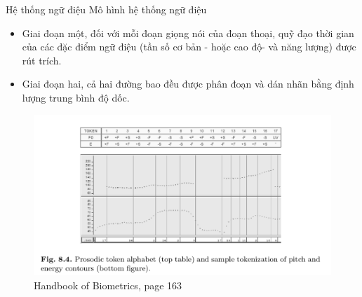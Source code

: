 \documentclass[notheorems, aspectratio=54]{beamer}
\begin{document}
\begin{frame}{Hệ thống ngữ điệu}
	Mô hình hệ thống ngữ điệu
	\begin{itemize}
		\item Giai đoạn một, đối với mỗi đoạn giọng nói của đoạn thoại, quỹ đạo thời gian của các đặc điểm ngữ điệu (tần số cơ bản - hoặc cao độ- và năng lượng) được rút trích.
		\item Giai đoạn hai, cả hai đường bao đều được phân đoạn và dán nhãn bằng định lượng trung bình
		độ dốc.
	\end{itemize}
	\begin{figure}
		\includegraphics[width=0.75\linewidth]{images/figure_8_4.png}
		\caption{Handbook of Biometrics, page 163}
		\label{fig:writing-thesis}
	\end{figure}
\end{frame}	
\end{document}
